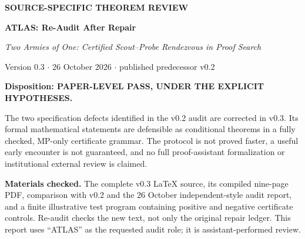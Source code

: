 \documentclass[11pt,letterpaper]{article}
\begin{document}
{\sffamily\bfseries\color{teal} SOURCE-SPECIFIC THEOREM REVIEW}\par
{\LARGE\bfseries\color{navy} ATLAS: Re-Audit After Repair}\vspace{4pt}\par
{\large \emph{Two Armies of One: Certified Scout--Probe Rendezvous in Proof Search}}\par
Version 0.3 $\cdot$ 26 October 2026 $\cdot$ published predecessor v0.2\par
\begin{tcolorbox}[colback=pale,colframe=teal,boxrule=.6pt]
\textbf{Disposition: PAPER-LEVEL PASS, UNDER THE EXPLICIT HYPOTHESES.}\par
The two specification defects identified in the v0.2 audit are corrected in v0.3. Its formal mathematical statements are defensible as conditional theorems in a fully checked, MP-only certificate grammar. The protocol is not proved faster, a useful early encounter is not guaranteed, and no full proof-assistant formalization or institutional external review is claimed.
\end{tcolorbox}
\textbf{Materials checked.} The complete v0.3 LaTeX source, its compiled nine-page PDF, comparison with v0.2 and the 26 October independent-style audit report, and a finite illustrative test program containing positive and negative certificate controls. Re-audit checks the new text, not only the original repair ledger. This report uses ``ATLAS'' as the requested audit role; it is assistant-performed review.
\end{document}
